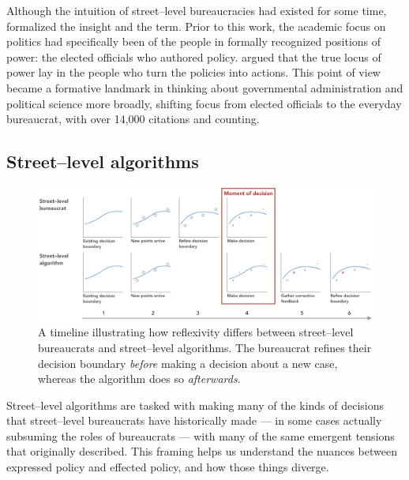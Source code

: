 \documentclass[main]{subfiles}
\begin{document}
Although the intuition of street--level bureaucracies had existed for some time,
\citeauthor{lipsky1983street} formalized the insight and the term.
Prior to this work, the academic focus on politics had specifically been of the people in formally recognized positions of power:
the elected officials who authored policy.
\citeauthor{lipsky1983street} argued that the true locus of power lay in the people who turn the policies into actions.
This point of view became a formative landmark in thinking about governmental administration and political science more broadly,
shifting focus from elected officials to the everyday bureaucrat, with over 14,000 citations and counting.

\subsection{Street--level algorithms}
\begin{figure}[tb]
  \centering
  \includegraphics[width=\textwidth]{figures/Curves.png}
  \caption{A timeline illustrating how reflexivity differs between street--level bureaucrats and street--level algorithms.
  The bureaucrat refines their decision boundary \textit{before} making a decision about a new case, whereas the algorithm does so \textit{afterwards}.\vspace{1em}}
  \label{fig:curves}
\end{figure}

Street--level algorithms are tasked with making many of the kinds of decisions that
street--level bureaucrats have historically made
--- in some cases actually subsuming the roles of bureaucrats ---
with many of the same emergent tensions that \citeauthor{lipsky1983street} originally described.
This framing helps us understand the nuances between expressed policy and effected policy, and
how those things diverge.
\end{document}
